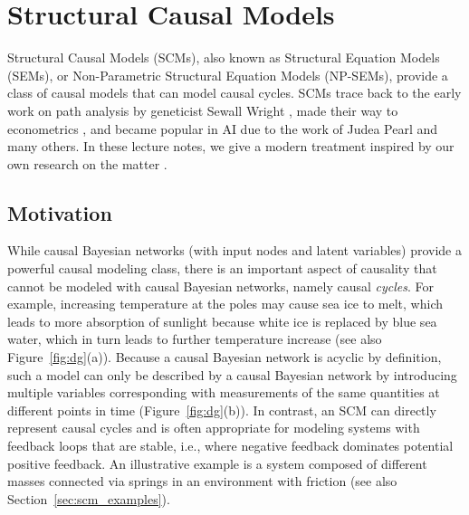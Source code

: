 \section{Structural Causal Models}


Structural Causal Models (SCMs), also known as Structural Equation Models (SEMs), or Non-Parametric Structural Equation Models (NP-SEMs), provide a class of causal models that can model causal cycles. 
SCMs trace back to the early work on path analysis by geneticist Sewall Wright \cite{Wri21}, made their way to econometrics \cite{Haa43,StrotzWold1960}, and became popular in AI due to the work of Judea Pearl \cite{Pearl09} and many others.
In these lecture notes, we give a modern treatment inspired by our own research on the matter \cite{BFPM21,FM20}.

\subsection{Motivation}

While causal Bayesian networks (with input nodes and latent variables) provide a powerful causal modeling class, there is an important aspect of causality that cannot be modeled with causal Bayesian networks, namely causal \emph{cycles}.
For example, increasing temperature at the poles may cause sea ice to melt, which leads to more absorption of sunlight because white ice is replaced by blue sea water, which in turn leads to further temperature increase (see also Figure~\ref{fig:dg}(a)).
Because a causal Bayesian network is acyclic by definition, such a model can only be described by a causal Bayesian network by introducing multiple variables corresponding with measurements of the same quantities at different points in time (Figure~\ref{fig:dg}(b)).
In contrast, an SCM can directly represent causal cycles and is often appropriate for modeling systems with feedback loops that are stable, i.e., where negative feedback dominates potential positive feedback. 
An illustrative example is a system composed of different masses connected via springs in an environment with friction (see also Section~\ref{sec:scm_examples}).

